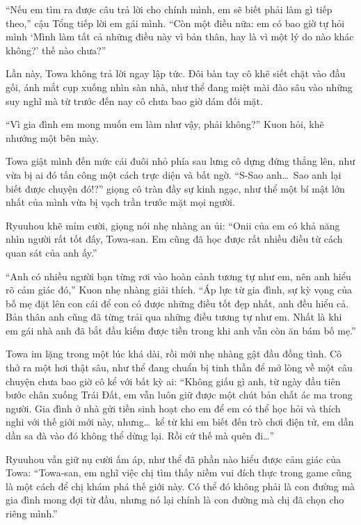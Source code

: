 \documentclass[../main.tex]{subfiles}
\begin{document}
``Nếu em tìm ra được câu trả lời cho chính mình, em sẽ biết phải làm gì tiếp theo,'' cậu Tổng tiếp lời em gái mình. ``Còn một điều nữa: em có bao giờ tự hỏi mình `Mình làm tất cả những điều này vì bản thân, hay là vì một lý do nào khác không?' thế nào chưa?''

Lần này, Towa không trả lời ngay lập tức. Đôi bàn tay cô khẽ siết chặt vào đầu gối, ánh mắt cụp xuống nhìn sàn nhà, như thể đang miệt mài đào sâu vào những suy nghĩ mà từ trước đến nay cô chưa bao giờ dám đối mặt.

``Vì gia đình em mong muốn em làm như vậy, phải không?'' Kuon hỏi, khẽ nhướng một bên mày.

Towa giật mình đến mức cái đuôi nhỏ phía sau lưng cô dựng đứng thẳng lên, như vừa bị ai đó tấn công một cách trực diện và bất ngờ. ``S-Sao anh\dots\ Sao anh lại biết được chuyện đó!?'' giọng cô tràn đầy sự kinh ngạc, như thể một bí mật lớn nhất của mình vừa bị vạch trần trước mặt mọi người.

Ryuuhou khẽ mỉm cười, giọng nói nhẹ nhàng an ủi: ``Onii của em có khả năng nhìn người rất tốt đấy, Towa-san. Em cũng đã học được rất nhiều điều từ cách quan sát của anh ấy.''

``Anh có nhiều người bạn từng rơi vào hoàn cảnh tương tự như em, nên anh hiểu rõ cảm giác đó,'' Kuon nhẹ nhàng giải thích. ``Áp lực từ gia đình, sự kỳ vọng của bố mẹ đặt lên con cái để con có được những điều tốt đẹp nhất, anh đều hiểu cả. Bản thân anh cũng đã từng trải qua những điều tương tự như em. Nhất là khi em gái nhà anh đã bắt đầu kiếm được tiền trong khi anh vẫn còn ăn bám bố mẹ.''

Towa im lặng trong một lúc khá dài, rồi mới nhẹ nhàng gật đầu đồng tình. Cô thở ra một hơi thật sâu, như thể đang chuẩn bị tinh thần để mở lòng về một câu chuyện chưa bao giờ cô kể với bất kỳ ai: ``Không giấu gì anh, từ ngày đầu tiên bước chân xuống Trái Đất, em vẫn luôn giữ được một chút bản chất ác ma trong người. Gia đình ở nhà gửi tiền sinh hoạt cho em để em có thể học hỏi và thích nghi với thế giới mới này, nhưng\dots\ kể từ khi em biết đến trò chơi điện tử, em dần dần sa đà vào đó không thể dừng lại. Rồi cứ thế mà quên đi\dots''

Ryuuhou vẫn giữ nụ cười ấm áp, như thể đã phần nào hiểu được cảm giác của Towa: ``Towa-san, em nghĩ việc chị tìm thấy niềm vui đích thực trong game cũng là một cách để chị khám phá thế giới này. Có thể đó không phải là con đường mà gia đình mong đợi từ đầu, nhưng nó lại chính là con đường mà chị đã chọn cho riêng mình.''
\end{document}
